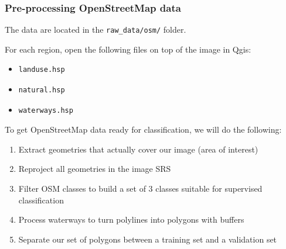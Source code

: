 \documentclass[8pt]{beamer}
\begin{document}
\begin{frame}[fragile]
\frametitle{Pre-processing OpenStreetMap data}

The data are located in the \texttt{raw\_data/osm/} folder.

For each region, open the following files on top of the image in Qgis:
\begin{itemize}
\item \begin{verbatim}landuse.hsp\end{verbatim}
\item \begin{verbatim}natural.hsp\end{verbatim}
\item \begin{verbatim}waterways.hsp\end{verbatim}
\end{itemize}

To get OpenStreetMap data ready for classification, we will do the following:
\begin{enumerate}
\item Extract geometries that actually cover our image (area of interest)
\item Reproject all geometries in the image SRS
\item Filter OSM classes to build a set of 3 classes suitable for supervised classification
\item Process waterways to turn polylines into polygons with buffers
\item Separate our set of polygons between a training set and a validation set
\end{enumerate}
\end{frame}
\end{document}
